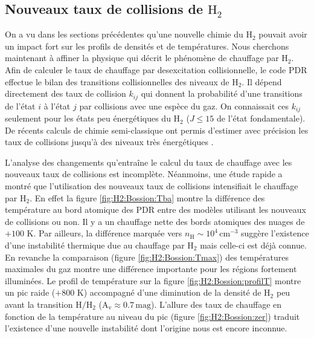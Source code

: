 \subsection{Nouveaux taux de collisions de $\mathrm{H}_2$}

On a vu dans les sections précédentes qu'une nouvelle chimie du $\mathrm{H}_2$ pouvait avoir un impact fort sur les profils de densités et de températures. Nous cherchons maintenant à affiner la physique qui décrit le phénomène de chauffage par $\mathrm{H}_2$. Afin de calculer le taux de chauffage par desexcitation collisionnelle, le code PDR effectue le bilan des transitions collisionnelles des niveaux de $\mathrm{H}_2$. Il dépend directement des taux de collision $k_{ij}$ qui donnent la probabilité d'une transitions de l'état $i$ à l'état $j$ par collisions avec une espèce du gaz. On connaissait ces $k_{ij}$ seulement pour les états peu énergétiques du $\mathrm{H}_2$ ($J\leq15$ de l'état fondamentale). De récents calculs de chimie semi-classique ont permis d'estimer avec précision les taux de collisions jusqu'à des niveaux très énergétiques \cite{Bossion}. \newline 

L'analyse des changements qu'entraîne le calcul du taux de chauffage avec les nouveaux taux de collisions est incomplète. Néanmoins, une étude rapide a montré que l'utilisation des nouveaux taux de collisions intensifiait le chauffage par $\mathrm{H}_2$. En effet la figure \ref{fig:H2:Bossion:Tba} montre la différence des température au bord atomique des PDR entre des modèles utilisant les nouveaux de collisions ou non. Il y a un chauffage nette des bords atomiques des nuages de $+100$ K. Par ailleurs, la différence marquée vers $n_\mathrm{H} \sim 10^4\,\mathrm{cm}^{-3}$ suggère l'existence d'une instabilité thermique due au chauffage par $\mathrm{H}_2$ mais celle-ci est déjà connue. En revanche la comparaison (figure \ref{fig:H2:Bossion:Tmax}) des températures maximales du gaz montre une différence importante pour les régions fortement illuminées. Le profil de température sur la figure \ref{fig:H2:Bossion:profilT} montre un pic raide ($+800$ K) accompagné d'une diminution de la densité de $\mathrm{H}_2$ peu avant la transition $\mathrm{H}/\mathrm{H}_2$ ($\mathrm{A}_\mathrm{v} \approx 0.7 \,\mathrm{mag}$). L'allure des taux de chauffage en fonction de la température au niveau du pic (figure \ref{fig:H2:Bossion:zer}) traduit l'existence d'une nouvelle instabilité dont l'origine nous est encore inconnue. \newline 

